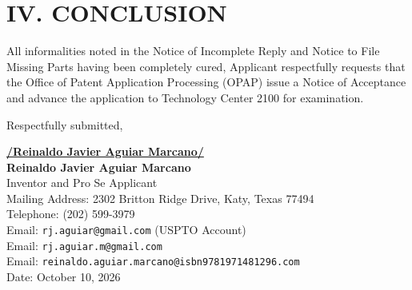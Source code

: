 \documentclass[11pt,letterpaper]{article}
\begin{document}
\section*{IV. CONCLUSION}

All informalities noted in the Notice of Incomplete Reply and Notice to File Missing Parts having been completely cured, Applicant respectfully requests that the Office of Patent Application Processing (OPAP) issue a Notice of Acceptance and advance the application to Technology Center 2100 for examination.

\vspace{0.6cm}
\begin{singlespace}
\noindent Respectfully submitted, \par\vspace{0.8cm}
\underline{\textbf{/Reinaldo Javier Aguiar Marcano/}} \\
\textbf{Reinaldo Javier Aguiar Marcano} \\
Inventor and Pro Se Applicant \\
Mailing Address: 2302 Britton Ridge Drive, Katy, Texas 77494 \\
Telephone: (202) 599-3979 \\
Email: \texttt{rj.aguiar@gmail.com} (USPTO Account) \\
Email: \texttt{rj.aguiar.m@gmail.com} \\
Email: \texttt{reinaldo.aguiar.marcano@isbn9781971481296.com} \\
Date: October 10, 2026
\end{singlespace}
\end{document}
